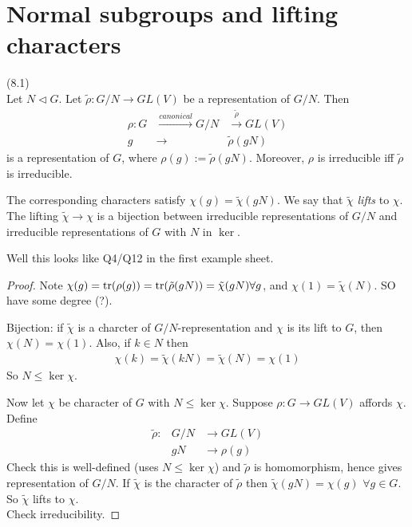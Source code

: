 \documentclass[a4paper]{article}
\begin{document}
\section{Normal subgroups and lifting characters}
\begin{lemma} (8.1)\\
Let $N \triangleleft G$. Let $\tilde{\rho} : G/N \to GL(V)$ be a representation of $G/N$. Then
\begin{equation*}
\begin{aligned}
\rho:G &\xrightarrow{canonical} G/N &\xrightarrow{\tilde{\rho}} GL(V)\\
g & \to & \tilde{\rho}(gN)
\end{aligned}
\end{equation*}
is a representation of $G$, where $\rho(g) := \tilde{\rho}(gN)$. Moreover, $\rho$ is irreducible iff $\tilde{\rho}$ is irreducible.

The corresponding characters satisfy $\chi(g) =\tilde{\chi} (gN)$. We say that $\tilde{\chi}$ \emph{lifts} to $\chi$. The lifting $\tilde{\chi} \to \chi$ is a bijection between irreducible representations of $G/N$ and irreducible representations of $G$ with $N$ in $\ker$.

Well this looks like Q4/Q12 in the first example sheet.

\begin{proof}
Note $\chi(g) = \operatorname{tr}(\rho(g)) = \operatorname{tr}(\tilde{\rho}(gN)) = \tilde{\chi}(gN) \forall g$, and $\chi(1) = \tilde{\chi}(N)$. SO have some degree (?).

Bijection: if $\tilde{\chi}$ is a charcter of $G/N$-representation and $\chi$ is its lift to $G$, then $\chi(N) = \chi(1)$. Also, if $k \in N$ then 
\begin{equation*}
\begin{aligned}
\chi(k) = \tilde{\chi} (kN) = \tilde{\chi}(N) = \chi(1)
\end{aligned}
\end{equation*}
So $N \leq \ker\chi$.

Now let $\chi$ be character of $G$ with $N \leq \ker\chi$. Suppose $\rho:G \to GL(V)$ affords $\chi$. Define
\begin{equation*}
\begin{aligned}
\tilde{\rho}: & G/N &\to GL(V)\\
&gN &\to \rho(g)
\end{aligned}
\end{equation*}
Check this is well-defined (uses $N \leq \ker\chi$) and $\tilde{\rho}$ is homomorphism, hence gives representation of $G/N$. If $\tilde{\chi}$ is the character of $\tilde{\rho}$ then $\tilde{\chi}(gN) = \chi(g)$ $\forall g\in G$. So $\tilde{\chi}$ lifts to $\chi$.\\
Check irreducibility.
\end{proof}
\end{lemma}
\end{document}
